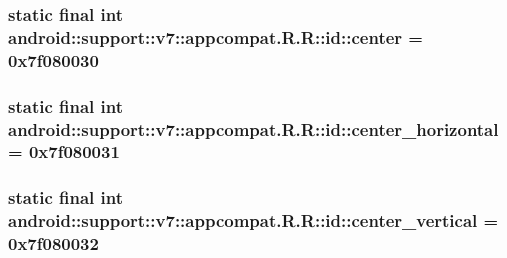 \hypertarget{classandroid_1_1support_1_1v7_1_1appcompat_1_1_r_1_1id_bfbf561987c074c1e1199d8797b50711}{
\subsubsection[{center}]{\setlength{\rightskip}{0pt plus 5cm}static final int android::support::v7::appcompat.R.R::id::center = 0x7f080030}}
\label{classandroid_1_1support_1_1v7_1_1appcompat_1_1_r_1_1id_bfbf561987c074c1e1199d8797b50711}


\hypertarget{classandroid_1_1support_1_1v7_1_1appcompat_1_1_r_1_1id_ffbd4d4ac15c849e558aef32b5c0f28d}{
\subsubsection[{center\_\-horizontal}]{\setlength{\rightskip}{0pt plus 5cm}static final int android::support::v7::appcompat.R.R::id::center\_\-horizontal = 0x7f080031}}
\label{classandroid_1_1support_1_1v7_1_1appcompat_1_1_r_1_1id_ffbd4d4ac15c849e558aef32b5c0f28d}


\hypertarget{classandroid_1_1support_1_1v7_1_1appcompat_1_1_r_1_1id_b1bd9a338d68fb9d33abc223c16cf045}{
\subsubsection[{center\_\-vertical}]{\setlength{\rightskip}{0pt plus 5cm}static final int android::support::v7::appcompat.R.R::id::center\_\-vertical = 0x7f080032}}
\label{classandroid_1_1support_1_1v7_1_1appcompat_1_1_r_1_1id_b1bd9a338d68fb9d33abc223c16cf045}


